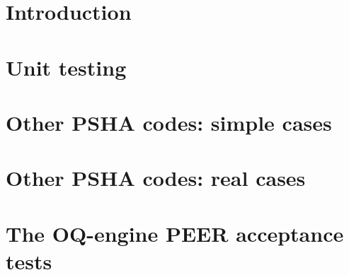 \documentclass[11pt,fleqn]{book} %
\begin{document}
\pagestyle{empty} %

\tableofcontents %

\cleardoublepage %

\pagestyle{fancy} %

\chapter{Introduction}

\chapter{Unit testing}

\chapter{Other PSHA codes: simple cases}

\chapter{Other PSHA codes: real cases}

\appendix
{} %
\chapter{The OQ-engine PEER acceptance tests}
\label{sec:app1}

\end{document}
